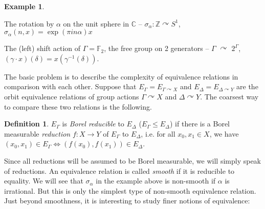 \documentclass[10pt]{amsart}
\newcommand{\TT}{\mathbb{T}}
\newcommand{\FF}{\mathbb{F}}
\newcommand{\ZZ}{\mathbb{Z}}
\newcommand{\QQ}{\mathbb{Q}}
\newcommand{\RR}{\mathbb{R}}
\newcommand{\CCC}{\mathbb{C}}
\theoremstyle{definition}
\newtheorem*{definition*}{Definition}
\newtheorem*{example*}{Example}
\theoremstyle{remark}
\newenvironment{enumerate-(a)}{\begin{enumerate}[label={\upshape (\alph*)}, leftmargin=2pc]}{\end{enumerate}}
\begin{document}
\begin{example*} 
\begin{enumerate-(a)} 
\item 
The rotation by $\alpha$ on the unit sphere in $\CCC$ -- 
$\sigma_\alpha\colon \ZZ\curvearrowright  S^1$, $\sigma_\alpha(n,x)=\exp(\pi i n \alpha)x$ 

\item 
The (left) shift action of $\Gamma=\FF_2$, the free group on 2 generators -- $\Gamma$ $\curvearrowright$ $2^{\Gamma}$, $(\gamma\cdot x)(\delta)=x(\gamma^{-1}(\delta))$. 
\end{enumerate-(a)} 
\end{example*} 


The basic problem is to describe the complexity of equivalence relations in comparison with each other. 
Suppose that $E_\Gamma=E_{\Gamma\curvearrowright X}$ and $E_\Delta=E_{\Delta\curvearrowright Y}$ are the orbit equivalence relations of group actions $\Gamma\curvearrowright X$ and $\Delta\curvearrowright Y$. 
The coarsest way to compare these two relations is the following. 

\begin{definition*} 
$E_\Gamma$ is \emph{Borel reducible} to $E_\Delta$ ($E_\Gamma\leq E_\Delta$) if there is a Borel measurable \emph{reduction} $f\colon X\rightarrow Y$ of $E_\Gamma$ to $E_\Delta$, i.e. for all $x_0,x_1\in X$, we have 
$(x_0,x_1)\in E_\Gamma\Longleftrightarrow (f(x_0),f(x_1))\in E_\Delta$. 
\end{definition*} 

Since all reductions will be assumed to be Borel measurable, we will simply speak of reductions. 
An equivalence relation is called \emph{smooth} if it is reducible to equality. 
We will see that $\sigma_\alpha$ in the example above is non-smooth if $\alpha$ is irrational. But this is only the simplest type of non-smooth equivalence relation. 
Just beyond smoothness, it is interesting to study finer notions of equivalence: 
\end{document}
